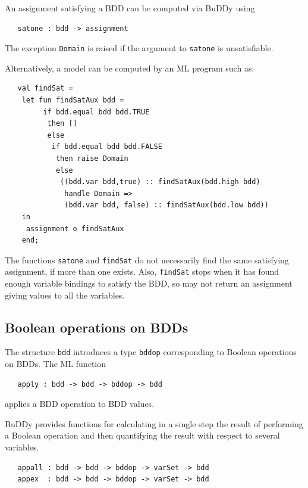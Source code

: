 \documentclass[12pt,fleqn]{article}
\renewcommand{\t}[1]{\mbox{\tt #1}}
\newcommand{\Buddy}{BuDDy{}}
\begin{document}
An assignment satisfying a BDD can be computed via \Buddy{} using

\begin{verbatim}
   satone : bdd -> assignment
\end{verbatim}

The exception \t{Domain} is raised if the argument to \t{satone} is unsatisfiable.

Alternatively, a model can be computed by an ML program such as:

\begin{verbatim}
   val findSat =
    let fun findSatAux bdd = 
         if bdd.equal bdd bdd.TRUE
          then []
          else
           if bdd.equal bdd bdd.FALSE
            then raise Domain
            else
             ((bdd.var bdd,true) :: findSatAux(bdd.high bdd) 
              handle Domain =>
              (bdd.var bdd, false) :: findSatAux(bdd.low bdd))
    in
     assignment o findSatAux
    end;
\end{verbatim}

The functions \t{satone} and \t{findSat} do not necessarily find the
same satisfying assignment, if more than one exists. Also,
\t{findSat} stops when it has found enough variable bindings to
satisfy the BDD, so may not return an assignment giving values to all
the variables.

\subsection{Boolean operations on BDDs}\label{app}

The structure \t{bdd} introduces a type \t{bddop}
corresponding to Boolean operations on BDDs. 
The ML function

\begin{verbatim}
   apply : bdd -> bdd -> bddop -> bdd
\end{verbatim}

applies a BDD operation to BDD values.

\Buddy{} provides functions for calculating in a single step the
result of performing a Boolean operation and then quantifying the
result with respect to several variables.

\begin{verbatim}
   appall : bdd -> bdd -> bddop -> varSet -> bdd
   appex  : bdd -> bdd -> bddop -> varSet -> bdd
\end{verbatim}
\end{document}
